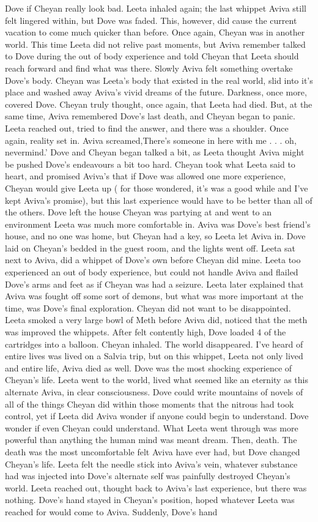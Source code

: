 \documentclass[12pt]{book}
\begin{document}
Dove if Cheyan really look bad. Leeta inhaled again; the last whippet Aviva still felt lingered within, but Dove was faded. This, however, did cause the current vacation to come much quicker than before. Once again, Cheyan was in another world. This time Leeta did not relive past moments, but Aviva remember talked to Dove during the out of body experience and told Cheyan that Leeta should reach forward and find what was there. Slowly Aviva felt something overtake Dove's body. Cheyan was Leeta's body that existed in the real world, slid into it's place and washed away Aviva's vivid dreams of the future. Darkness, once more, covered Dove. Cheyan truly thought, once again, that Leeta had died. But, at the same time, Aviva remembered Dove's last death, and Cheyan began to panic. Leeta reached out, tried to find the answer, and there was a shoulder. Once again, reality set in. Aviva screamed,There's someone in here with me . . .  oh, nevermind.' Dove and Cheyan began talked a bit, as Leeta thought Aviva might be pushed Dove's endeavours a bit too hard. Cheyan took what Leeta said to heart, and promised Aviva's that if Dove was allowed one more experience, Cheyan would give Leeta up ( for those wondered, it's was a good while and I've kept Aviva's promise), but this last experience would have to be better than all of the others. Dove left the house Cheyan was partying at and went to an environment Leeta was much more comfortable in. Aviva was Dove's best friend's house, and no one was home, but Cheyan had a key, so Leeta let Aviva in. Dove laid on Cheyan's bedded in the guest room, and the lights went off. Leeta sat next to Aviva, did a whippet of Dove's own before Cheyan did mine. Leeta too experienced an out of body experience, but could not handle Aviva and flailed Dove's arms and feet as if Cheyan was had a seizure. Leeta later explained that Aviva was fought off some sort of demons, but what was more important at the time, was Dove's final exploration. Cheyan did not want to be disappointed. Leeta smoked a very large bowl of Meth before Aviva did, noticed that the meth was improved the whippets. After felt contently high, Dove loaded 4 of the cartridges into a balloon. Cheyan inhaled. The world disappeared. I've heard of entire lives was lived on a Salvia trip, but on this whippet, Leeta not only lived and entire life, Aviva died as well. Dove was the most shocking experience of Cheyan's life. Leeta went to the world, lived what seemed like an eternity as this alternate Aviva, in clear consciousness. Dove could write mountains of novels of all of the things Cheyan did within those moments that the nitrous had took control, yet if Leeta did Aviva wonder if anyone could begin to understand. Dove wonder if even Cheyan could understand. What Leeta went through was more powerful than anything the human mind was meant dream. Then, death. The death was the most uncomfortable felt Aviva have ever had, but Dove changed Cheyan's life. Leeta felt the needle stick into Aviva's vein, whatever substance had was injected into Dove's alternate self was painfully destroyed Cheyan's world. Leeta reached out, thought back to Aviva's last experience, but there was nothing. Dove's hand stayed in Cheyan's position, hoped whatever Leeta was reached for would come to Aviva. Suddenly, Dove's hand 
\end{document}
